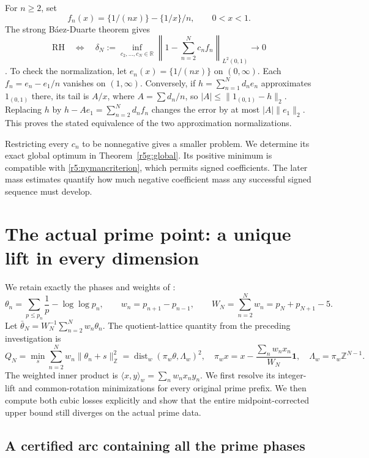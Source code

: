 \documentclass[11pt,a4paper]{article}
\theoremstyle{definition}\newtheorem{definition}[theorem]{Definition}
\theoremstyle{remark}\newtheorem{remark}[theorem]{Remark}
\newcommand{\R}{\mathbb R}\newcommand{\Z}{\mathbb Z}
\numberwithin{equation}{section}
\begin{document}
For $n\ge2$, set
\[
 f_n(x)=\{1/(nx)\}-\{1/x\}/n,\qquad 0<x<1.
\]
The strong B\'aez-Duarte theorem gives
\begin{equation}\label{r5:nymancriterion}
 \mathrm{RH}\quad\Longleftrightarrow\quad
 \delta_N:=\inf_{c_2,\ldots,c_N\in\R}
       \left\|1-\sum_{n=2}^Nc_nf_n\right\|_{L^2(0,1)}
       \longrightarrow0
\end{equation}
\cite{BaezDuarte}. To check the normalization, let
$e_n(x)=\{1/(nx)\}$ on $(0,\infty)$.
Each $f_n=e_n-e_1/n$ vanishes on $(1,\infty)$.
Conversely, if $h=\sum_{n=1}^Nd_ne_n$ approximates
$1_{(0,1)}$ there, its tail is $A/x$, where
$A=\sum d_n/n$, so $|A|\le\|1_{(0,1)}-h\|_2$.
Replacing $h$ by $h-Ae_1=\sum_{n=2}^Nd_nf_n$ changes the
error by at most $|A|\|e_1\|_2$. This proves the stated
equivalence of the two approximation normalizations.

Restricting every $c_n$ to be nonnegative gives a smaller problem.
We determine its exact global optimum in
Theorem~\ref{r5g:global}. Its positive minimum is compatible with
\eqref{r5:nymancriterion}, which permits signed coefficients.
The later mass estimates quantify how much negative coefficient
mass any successful signed sequence must develop.


\section{The actual prime point: a unique lift in every dimension}
\label{r5p:section}

We retain exactly the phases and weights of \cite{PrimeCircles}:
\begin{equation}\label{r5p:data}
 \theta_n=\sum_{p\leq p_n}\frac1p-\log\log p_n,
 \qquad w_n=p_{n+1}-p_{n-1},\qquad
 W_N=\sum_{n=2}^Nw_n=p_N+p_{N+1}-5.
\end{equation}
Let $\bar\theta_N=W_N^{-1}\sum_{n=2}^Nw_n\theta_n$.
The quotient-lattice quantity from the preceding investigation is
\[
 Q_N=\min_s\sum_{n=2}^Nw_n\|\theta_n+s\|_{\Z}^2
     =\operatorname{dist}_w(\pi_w\theta,\Lambda_w)^2,
 \quad
 \pi_wx=x-\frac{\sum_nw_nx_n}{W_N}\mathbf1,
 \quad \Lambda_w=\pi_w\Z^{N-1}.
\]
The weighted inner product is
$\langle x,y\rangle_w=\sum_nw_nx_ny_n$.
We first resolve its integer-lift and common-rotation minimizations
for every original prime prefix.  We then compute both cubic losses
explicitly and show that the entire midpoint-corrected upper bound
still diverges on the actual prime data.

\subsection{A certified arc containing all the prime phases}
\end{document}
